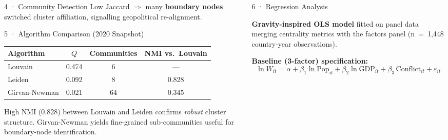 \documentclass[final]{beamer}
\newcommand{\colsep}{2cm}   %
\begin{document}
\begin{frame}[t,fragile]
\begin{columns}[T]
\begin{column}{0.30\textwidth}
\begin{block}{4 · Community Detection}
    \vspace{0.5em}
    Low Jaccard $\Rightarrow$ many \textbf{boundary nodes}
    switched cluster affiliation, signalling geopolitical
    re-alignment.

  \end{block}

  \begin{block}{5 · Algorithm Comparison (2020 Snapshot)}
    \begin{center}
    \small
    \renewcommand{\arraystretch}{1.2}
    \begin{tabular}{lccc}
      \toprule
      \textbf{Algorithm} & \textbf{$Q$} &
      \textbf{Communities} & \textbf{NMI vs.\ Louvain} \\
      \midrule
      Louvain       & 0.474 & 6  & — \\
      Leiden        & 0.092 & 8  & 0.828 \\
      Girvan-Newman & 0.021 & 64 & 0.345 \\
      \bottomrule
    \end{tabular}
    \end{center}

    \vspace{0.4em}
    High NMI (0.828) between Louvain and Leiden confirms
    \emph{robust} cluster structure. Girvan-Newman yields
    fine-grained sub-communities useful for boundary-node
    identification.
  \end{block}

\end{column}

\hspace{\colsep}
\begin{column}{0.30\textwidth}

  \begin{block}{6 · Regression Analysis}

    \textbf{Gravity-inspired OLS model} fitted on
    panel data merging centrality metrics with
    the factors panel (n~=~1,448 country-year observations).

    \vspace{0.6em}
    \textbf{Baseline (3-factor) specification:}
    \[
      \ln W_{it} = \alpha + \beta_1\ln\text{Pop}_{it}
                   + \beta_2\ln\text{GDP}_{it}
                   + \beta_3\,\text{Conflict}_{it}
                   + \varepsilon_{it}
    \]


\end{block}
\end{column}
\end{columns}
\end{frame}
\end{document}
